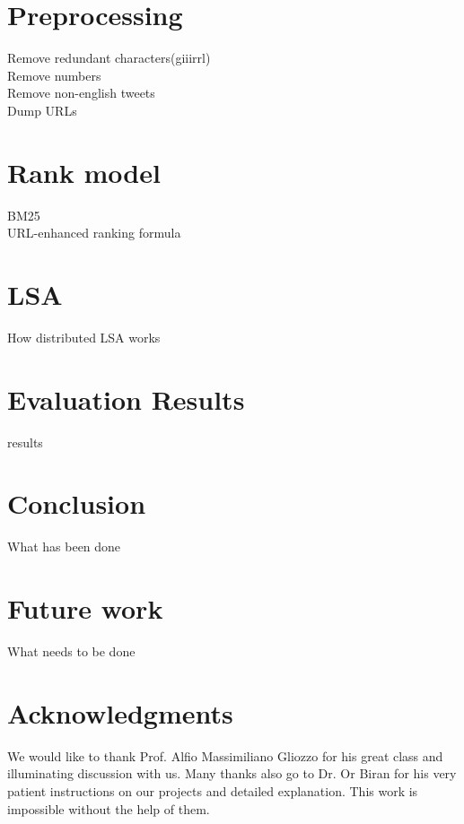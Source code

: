\documentclass{acm_proc_article-sp}
\begin{document}
\section{Preprocessing}
Remove redundant characters(giiirrl)\\
Remove numbers\\
Remove non-english tweets\\
Dump URLs\\

\section{Rank model}
BM25\\
URL-enhanced ranking formula

\section{LSA}
How distributed LSA works\\

\section{Evaluation Results}
results\\

\section{Conclusion}
What has been done 

\section{Future work}
What needs to be done

\section{Acknowledgments}
We would like to thank Prof. Alfio Massimiliano Gliozzo for his great class and illuminating discussion with us. Many thanks also go to Dr. Or Biran for his very patient instructions on our projects and detailed explanation. This work is impossible without the help of them. 



\balancecolumns
\end{document}
